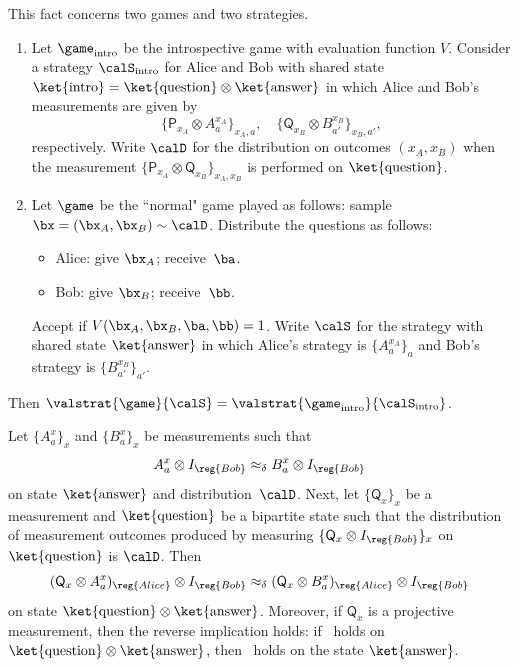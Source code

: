 \begin{fact}\label{fact:introspective-outrospective}
This fact concerns two games and two strategies.
\begin{enumerate}
\item Let $\game_{\mathrm{intro}}$ be the introspective game with evaluation function $V$.
Consider a strategy $\calS_{\mathrm{intro}}$ for Alice and Bob with shared state $\ket{\mathrm{intro}} = \ket{\mathrm{question}}\otimes \ket{\mathrm{answer}}$
in which Alice and Bob's measurements are given by
\begin{equation*}
\{\mathsf{P}_{x_A} \otimes A^{x_A}_a\}_{x_A, a}, \quad \{\mathsf{Q}_{x_B} \otimes B^{x_B}_{a'}\}_{x_B, a'},
\end{equation*} 
respectively.
Write $\calD$ for the distribution on outcomes $(x_A, x_B)$
when the measurement $\{\mathsf{P}_{x_A} \otimes \mathsf{Q}_{x_B}\}_{x_A, x_B}$ is performed on $\ket{\mathrm{question}}$.
\item Let $\game$ be the ``normal" game played as follows: sample $\bx = (\bx_A, \bx_B) \sim \calD$. Distribute the questions as follows:
	\begin{itemize}
	\item[$\circ$] Alice: give $\bx_A$; receive~$\ba$.
	\item[$\circ$] Bob: give $\bx_B$; receive~$\bb$.
	\end{itemize}
	Accept if $V(\bx_A, \bx_B, \ba, \bb) = 1$.
	Write $\calS$ for the strategy with shared state $\ket{\mathrm{answer}}$ in which Alice's strategy is $\{A^{x_A}_a\}_a$
	and Bob's strategy is $\{B^{x_B}_{a'}\}_{a'}$.
\end{enumerate}
Then $\valstrat{\game}{\calS} = \valstrat{\game_{\mathrm{intro}}}{\calS_{\mathrm{intro}}}$.
\end{fact}

\begin{fact}\label{fact:introspectivize-it}
Let $\{A^x_a\}_x$ and $\{B^x_a\}_x$ be measurements such that
\begin{equation}\label{eq:outro-approx}
A^x_a \otimes I_{\reg{Bob}} \approx_\delta B^x_a \otimes I_{\reg{Bob}}
\end{equation}
on state $\ket{\mathrm{answer}}$ and distribution~$\calD$. Next, let $\{\mathsf{Q}_x\}_x$ be a measurement and $\ket{\mathrm{question}}$ be a bipartite state
such that the distribution of measurement outcomes produced by measuring $\{\mathsf{Q}_x \otimes I_{\reg{Bob}}\}_x$ on $\ket{\mathrm{question}}$ is $\calD$.
Then
\begin{equation}\label{eq:intro-approx}
(\mathsf{Q}_x \otimes A^x_a)_{\reg{Alice}} \otimes I_{\reg{Bob}} \approx_{\delta} (\mathsf{Q}_x \otimes B^x_a)_{\reg{Alice}} \otimes I_{\reg{Bob}}
\end{equation}
on state $\ket{\mathrm{question}}\otimes
\ket{\mathrm{answer}}$. Moreover, if $\mathsf{Q}_x$ is a projective
measurement, then the reverse implication holds:
if~ holds on $\ket{\mathrm{question}} \otimes
\ket{\mathrm{answer}}$, then~ holds on the state $\ket{\mathrm{answer}}$.
\end{fact}

